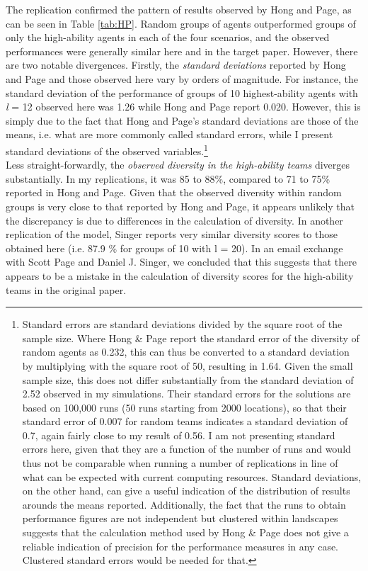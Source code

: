     
The replication confirmed the pattern of results observed by Hong and Page, as can be seen in Table \ref{tab:HP}. Random groups of agents outperformed groups of only the high-ability agents in each of the four scenarios, and the observed performances were generally similar here and in the target paper. However, there are two notable divergences. Firstly, the \textit{standard deviations} reported by Hong and Page and those observed here vary by orders of magnitude. For instance, the standard deviation of the performance of groups of 10 highest-ability agents with \textit{l} = 12 observed here was 1.26 while Hong and Page report 0.020. However, this is simply due to the fact that Hong and Page's standard deviations are those of the means, i.e. what are more commonly called standard errors, while I present standard deviations of the observed variables.\footnote{Standard errors are standard deviations divided by the square root of the sample size. Where Hong & Page report the standard error of the diversity of random agents as 0.232, this can thus be converted to a standard deviation by multiplying with the square root of 50, resulting in 1.64. Given the small sample size, this does not differ substantially from the standard deviation of 2.52 observed in my simulations. Their standard errors for the solutions are based on 100,000 runs (50 runs starting from 2000 locations), so that their standard error of 0.007 for random teams indicates a standard deviation of 0.7, again fairly close to my result of 0.56. I am not presenting standard errors here, given that they are a function of the number of runs and would thus not be comparable when running a number of replications in line of what can be expected with current computing resources. Standard deviations, on the other hand, can give a useful indication of the distribution of results arounds the means reported. Additionally, the fact that the runs to obtain performance figures are not independent but clustered within landscapes suggests that the calculation method used by Hong & Page does not give a reliable indication of precision for the performance measures in any case. Clustered standard errors would be needed for that.} \\

Less straight-forwardly, the \textit{observed diversity in the high-ability teams} diverges substantially. In my replications, it was 85 to 88\%, compared to 71 to 75\% reported in Hong and Page. Given that the observed diversity within random groups is very close to that reported by Hong and Page, it appears unlikely that the discrepancy is due to differences in the calculation of diversity. In another replication of the model, Singer \supercite{singer2019diversity} reports very similar diversity scores to those obtained here (i.e. 87.9 \% for groups of 10 with l = 20). In an email exchange with Scott Page and Daniel J. Singer, we concluded that this suggests that there appears to be a mistake in the calculation of diversity scores for the high-ability teams in the original paper. \\


